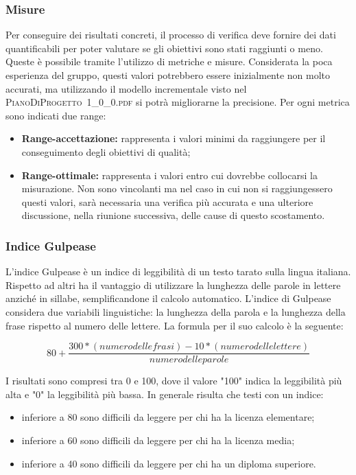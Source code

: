		\subsubsection{Misure}
		Per conseguire dei risultati concreti, il processo di verifica deve fornire dei dati quantificabili per poter valutare se gli obiettivi sono stati raggiunti o meno. Queste è possibile tramite l’utilizzo di metriche e misure. Considerata la poca esperienza del gruppo, questi valori potrebbero essere inizialmente non molto accurati, ma utilizzando il modello incrementale visto nel \hbox{\textsc{PianoDiProgetto 1\_0\_0.pdf}} si potrà migliorarne la precisione.
		Per ogni metrica sono indicati due range:
		\begin{itemize}
			\item \textbf{Range-accettazione: }rappresenta i valori minimi da raggiungere per il conseguimento degli obiettivi di qualità;
			\item \textbf{Range-ottimale: }rappresenta i valori entro cui dovrebbe collocarsi la misurazione. Non sono vincolanti ma nel caso in cui non si raggiungessero questi valori, sarà necessaria una verifica più accurata e una ulteriore discussione, nella riunione successiva, delle cause di questo scostamento.
		\end{itemize}
	
		\subsubsection{Indice Gulpease}
		L'indice Gulpease è un indice di leggibilità di un testo tarato sulla lingua italiana. Rispetto ad altri ha il vantaggio di utilizzare la lunghezza delle parole in lettere anziché in sillabe, semplificandone il calcolo automatico.
		L'indice di Gulpease considera due variabili linguistiche: la lunghezza della parola e la lunghezza della frase rispetto al numero delle lettere.
		La formula per il suo calcolo è la seguente:
		
		\[ 80+\frac{300*(numero delle frasi)-10*(numero delle lettere)}{numero delle parole} \]
		
		
		I risultati sono compresi tra 0 e 100, dove il valore "100" indica la leggibilità più alta e "0" la leggibilità più bassa. In generale risulta che testi con un indice:
		\begin{itemize}
			\item inferiore a 80 sono difficili da leggere per chi ha la licenza elementare;
			\item inferiore a 60 sono difficili da leggere per chi ha la licenza media;
			\item inferiore a 40 sono difficili da leggere per chi ha un diploma superiore.
		\end{itemize}
		
